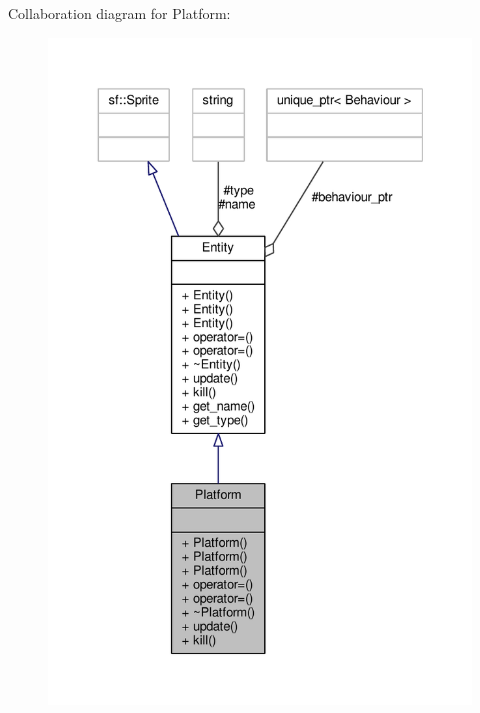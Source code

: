 Collaboration diagram for Platform\+:\nopagebreak
\begin{figure}[H]
\begin{center}
\leavevmode
\includegraphics[width=336pt]{classPlatform__coll__graph}
\end{center}
\end{figure}
